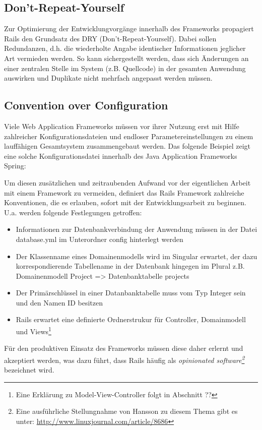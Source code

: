 \subsection{Don't-Repeat-Yourself}
Zur Optimierung der Entwicklungvorgänge innerhalb des Frameworks propagiert Rails den Grundsatz des DRY (Don't-Repeat-Yourself). Dabei sollen Redundanzen, d.h. die wiederholte Angabe identischer Informationen jeglicher Art vermieden werden. So kann sichergestellt werden, dass sich Änderungen an einer zentralen Stelle im System (z.B. Quellcode) in der gesamten Anwendung auswirken und Duplikate nicht mehrfach angepasst werden müssen.
\subsection{Convention over Configuration}
Viele Web Application Frameworks müssen vor ihrer Nutzung erst mit Hilfe zahlreicher Konfigurationsdateien und endloser Parametereinstellungen zu einem lauffähigen Gesamtsystem zusammengebaut werden. Das folgende Beispiel zeigt eine solche Konfigurationsdatei innerhalb des Java Application Frameworks Spring:



Um diesen zusätzlichen und zeitraubenden Aufwand vor der eigentlichen Arbeit mit einem Framework zu vermeiden, definiert das Rails Framework zahlreiche Konventionen, die es erlauben, sofort mit der Entwicklungsarbeit zu beginnen. U.a. werden folgende Festlegungen getroffen:

\begin{itemize}
\item
Informationen zur Datenbankverbindung der Anwendung müssen in der Datei database.yml im Unterordner config hinterlegt werden
\item
Der Klassenname eines Domainenmodells wird im Singular erwartet, der dazu korrespondierende Tabellename in der Datenbank hingegen im Plural z.B. Domainenmodell Project => Datenbanktabelle projects
\item
Der Primärschlüssel in einer Datanbanktabelle muss vom Typ Integer sein und den Namen ID besitzen
\item
Rails erwartet eine definierte Ordnerstrukur für Controller, Domainmodell und Views\footnote{Eine Erklärung zu Model-View-Controller folgt in Abschnitt ??}
\end{itemize}
Für den produktiven Einsatz des Frameworks müssen diese daher erlernt und akzeptiert werden, was dazu führt, dass Rails häufig als \emph{opinionated software\footnote{Eine ausführliche Stellungnahme von Hansson zu diesem Thema gibt es unter: \href{http://www.linuxjournal.com/article/8686}{http://www.linuxjournal.com/article/8686}}} bezeichnet wird.

